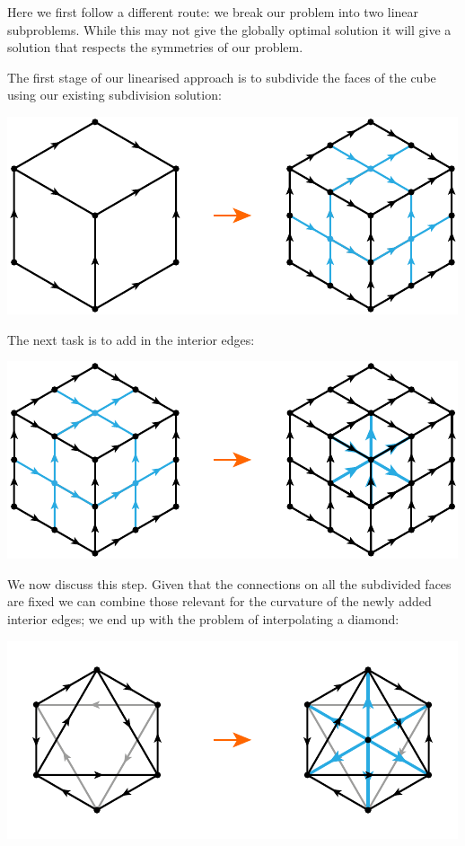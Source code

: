 \documentclass[12pt]{amsart}
\theoremstyle{definition}
\theoremstyle{remark}
\numberwithin{equation}{section}
\begin{document}
Here we first follow a different route: we break our problem into two linear subproblems. While this may not give the globally optimal solution it will give a solution that respects the symmetries of our problem.

The first stage of our linearised approach is to subdivide the faces of the cube using our existing subdivision solution:
\begin{center}
	\includegraphics{cubeinterpf1.pdf}
\end{center}
The next task is to add in the interior edges:
\begin{center}
	\includegraphics{cubeinterpf2.pdf}
\end{center}
We now discuss this step. Given that the connections on all the subdivided faces are fixed we can combine those relevant for the curvature of the newly added interior edges; we end up with the problem of interpolating a diamond:
\begin{center}
	\includegraphics{diamondinterp.pdf}
\end{center}
\end{document}
